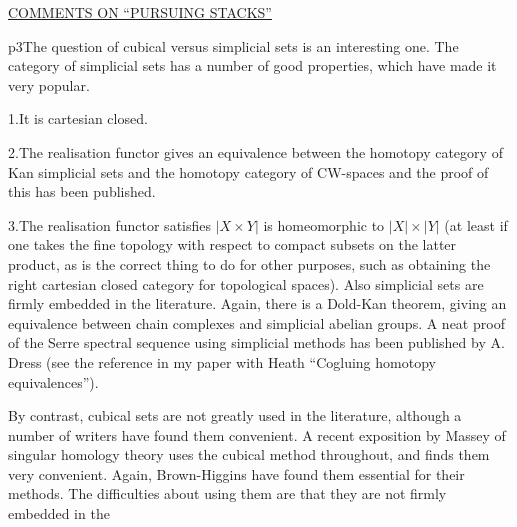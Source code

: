 \begin{center}\uline{COMMENTS ON ``PURSUING STACKS''}\end{center}


p3\qquad The question of cubical versus simplicial sets is an interesting one. The category of simplicial sets has a number of good properties, which have made it very popular.

1.\quad It is cartesian closed.

2.\quad The realisation functor gives an equivalence between the homotopy category of Kan simplicial sets and the homotopy category of CW-spaces and the proof of this has been published.

3.\quad The realisation functor satisfies $\lvert X\times Y\rvert$ is homeomorphic to $\lvert X\rvert\times\lvert Y\rvert$ (at least if one takes the fine topology with respect to compact subsets on the latter product, as is the correct thing to do for other purposes, such as obtaining the right cartesian closed category for topological spaces). Also simplicial sets are firmly embedded in the literature. Again, there is a Dold-Kan theorem, giving an equivalence between chain complexes and simplicial abelian groups. A neat proof of the Serre spectral sequence using simplicial methods has been published by A. Dress (see the reference in my paper with Heath ``Cogluing homotopy equivalences'').

By contrast, cubical sets are not greatly used in the literature, although a number of writers have found them convenient. A recent exposition by Massey of singular homology theory uses the cubical method throughout, and finds them very convenient. Again, Brown-Higgins have found them essential for their methods. The difficulties about using them are that they are not firmly embedded in the
